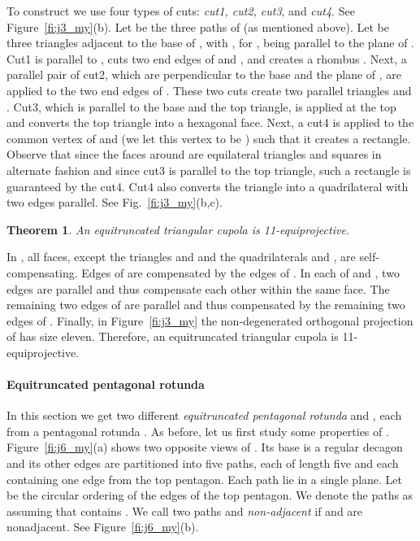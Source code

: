 \documentclass{article}
\newtheorem{theorem}{Theorem}
\newenvironment{proof}
{{\noindent\bf Proof}}{}
\begin{document}
To construct  we use four types of cuts: \emph{cut1, cut2, cut3}, and \emph{cut4}.
See Figure~\ref{fi:j3_my}(b).
Let  be the three paths of  (as mentioned above).
Let  be three triangles adjacent to the base of ,
with , for , being parallel to the plane of . 
Cut1 is parallel to , cuts two end edges of  and ,
and creates a rhombus .
Next, a parallel pair of cut2, which are perpendicular to the base and 
the plane of , are applied to the two end edges of .
These two cuts create two parallel triangles  and .
Cut3, which is parallel to the base and the top triangle, 
is applied at the top and converts the top triangle into a hexagonal face.
Next, a cut4 is applied to the common vertex of  and 
(we let this vertex to be ) such that it creates a rectangle. 
Observe that since the faces around  are equilateral triangles and squares in alternate fashion
and since cut3 is parallel to the top triangle, such a rectangle is guaranteed by the cut4.
Cut4 also converts the triangle  into a quadrilateral  with two edges parallel.
See Fig.~\ref{fi:j3_my}(b,c).


\begin{theorem}
\label{th:P3}
An equitruncated triangular cupola is 11-equiprojective.
\end{theorem}

\begin{proof}
In , all faces, except the triangles  and  and the quadrilaterals  and ,
are self-compensating.
Edges of  are compensated by the edges of .
In each of  and , two edges are parallel and thus compensate each other
within the same face.
The remaining two edges of  are parallel and thus compensated by the remaining two edges of .
Finally, in  Figure~\ref{fi:j3_my} the non-degenerated orthogonal projection of  has size eleven.
Therefore, an equitruncated triangular cupola is 11-equiprojective.
\end{proof}


\paragraph{Equitruncated pentagonal rotunda}
In this section we get two different \emph{equitruncated pentagonal rotunda}  and ,
each from a pentagonal rotunda .
As before, let us first study some properties of .
Figure~\ref{fi:j6_my}(a) shows two opposite views of .
Its base is a regular decagon and its other edges are partitioned into five paths, 
each of length five and each containing one edge from the top pentagon.
Each path lie in a single plane. 
Let  be the circular ordering of the edges of the top pentagon.
We denote the paths as  assuming that 
contains .
We call two paths  and  {\it non-adjacent} if  and 
are nonadjacent. See Figure~\ref{fi:j6_my}(b).
\end{document}

